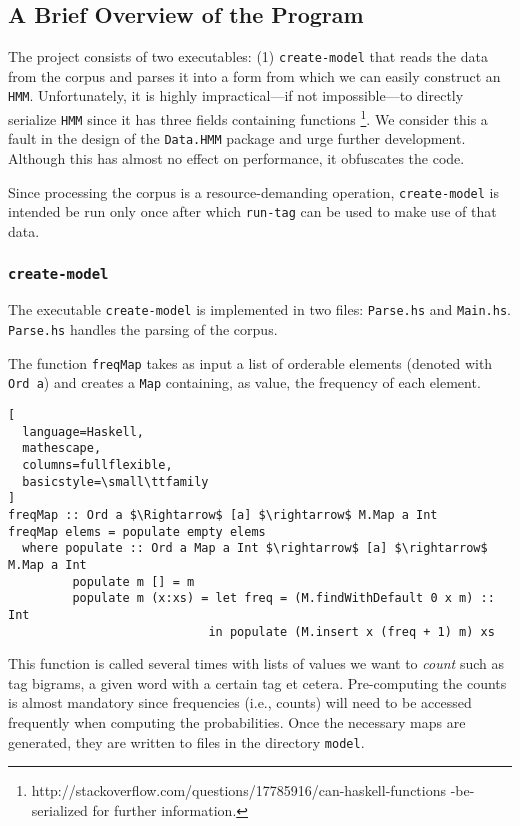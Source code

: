 \documentclass{article}
\begin{document}
\subsection{A Brief Overview of the Program}
The project consists of two executables: (1) \texttt{create-model} that reads
the data from the corpus and parses it into a form from which we can easily
construct an \texttt{HMM}. Unfortunately, it is highly impractical---if not
impossible---to directly serialize \texttt{HMM} since it has three fields
containing functions
\footnote{http://stackoverflow.com/questions/17785916/can-haskell-functions
  -be-serialized for further information.}. We consider this a fault in the
design of the \texttt{Data.HMM} package and urge further development. Although
this has almost no effect on performance, it obfuscates the code.

Since processing the corpus is a resource-demanding operation,
\texttt{create-model} is intended be run only once after which \texttt{run-tag}
can be used to make use of that data.

\subsubsection{\texttt{create-model}}
The executable \texttt{create-model} is implemented in two files:
\texttt{Parse.hs} and \texttt{Main.hs}. \texttt{Parse.hs} handles the parsing of
the corpus.

The function \texttt{freqMap} takes as input a list of orderable elements
(denoted with \texttt{Ord a}) and creates a \texttt{Map} containing, as value,
the frequency of each element.

\begin{lstlisting}[
  language=Haskell,
  mathescape,
  columns=fullflexible,
  basicstyle=\small\ttfamily
]
freqMap :: Ord a $\Rightarrow$ [a] $\rightarrow$ M.Map a Int
freqMap elems = populate empty elems
  where populate :: Ord a Map a Int $\rightarrow$ [a] $\rightarrow$ M.Map a Int
         populate m [] = m
         populate m (x:xs) = let freq = (M.findWithDefault 0 x m) :: Int
                            in populate (M.insert x (freq + 1) m) xs
\end{lstlisting}

This function is called several times with lists of values we want to
\emph{count} such as tag bigrams, a given word with a certain tag et cetera.
Pre-computing the counts is almost mandatory since frequencies (i.e., counts)
will need to be accessed frequently when computing the probabilities. Once the
necessary maps are generated, they are written to files in the directory
\texttt{model}.
\end{document}
